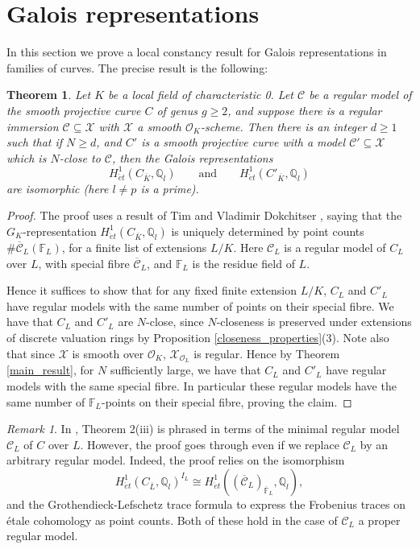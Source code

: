 \documentclass{article}
\theoremstyle{definition}
\theoremstyle{plain}
\newtheorem{thm}[defn]{Theorem}
\theoremstyle{remark}
\newtheorem{remark}[defn]{Remark}
\begin{document}
	\section{Galois representations}\label{section_galois_reps}
	In this section we prove a local constancy result for Galois representations in families of curves. The precise result is the following:
	\begin{thm}\label{galois_rep_local_constancy}
		Let $K$ be a local field of characteristic 0. Let $\mathcal{C}$ be a regular model of the smooth projective curve $C$ of genus $g\ge 2$, and suppose there is a regular immersion $\mathcal{C}\subseteq \mathcal{X}$ with $\mathcal{X}$ a smooth $\mathcal{O}_K$-scheme. Then there is an integer $d\ge 1$ such that if $N\ge d$, and $C'$ is a smooth projective curve with a model $\mathcal{C}'\subseteq \mathcal{X}$ which is $N$-close to $\mathcal{C}$, then the Galois representations
		\[H^1_{\acute{e}t}(C_{\overline{K}}, \mathbb{Q}_l)\qquad\text{and}\qquad H^1_{\acute{e}t}(C'_{\overline{K}}, \mathbb{Q}_l)\]
		are isomorphic (here $l\not=p$ is a prime).
	\end{thm}
	\begin{proof}
		The proof uses a result of Tim and Vladimir Dokchitser \cite[Theorem 2(iii)]{MR4898315}, saying that the $G_K$-representation $H^1_{\acute{e}t}(C_{\overline{K}}, \mathbb{Q}_l)$ is uniquely determined by point counts $\# \overline{\mathcal{C}}_L(\mathbb{F}_L)$, for a finite list of extensions $L/K$. Here $\mathcal{C}_L$ is a regular model of $C_L$ over $L$, with special fibre $\overline{\mathcal{C}}_L$, and $\mathbb{F}_L$ is the residue field of $L$.
		
		Hence it suffices to show that for any fixed finite extension $L/K$, $C_L$ and $C'_L$ have regular models with the same number of points on their special fibre. We have that $C_L$ and $C'_L$ are $N$-close, since $N$-closeness is preserved under extensions of discrete valuation rings by Proposition \ref{closeness_properties}(3).	Note also that since $\mathcal{X}$ is smooth over $\mathcal{O}_K$, $\mathcal{X}_{\mathcal{O}_L}$ is regular. Hence by Theorem \ref{main_result}, for $N$ sufficiently large, we have that $C_L$ and $C'_L$ have regular models with the same special fibre. In particular these regular models have the same number of $\mathbb{F}_L$-points on their special fibre, proving the claim.
	\end{proof}
	\begin{remark}
		In \cite{MR4898315}, Theorem 2(iii) is phrased in terms of the minimal regular model $\mathcal{C}_L$ of $C$ over $L$. However, the proof goes through even if we replace $\mathcal{C}_L$ by an arbitrary regular model. Indeed, the proof relies on the isomorphism
		\[H^1_{\acute{e}t}(C_{\overline{L}}, \mathbb{Q}_l)^{I_L}\cong H^1_{\acute{e}t}((\overline{\mathcal{C}}_L)_{\overline{\mathbb{F}}_L}, \mathbb{Q}_l),\]
		and the Grothendieck-Lefschetz trace formula to express the Frobenius traces on étale cohomology as point counts. Both of these hold in the case of $\mathcal{C}_L$ a proper regular model.
	\end{remark}
\end{document}
